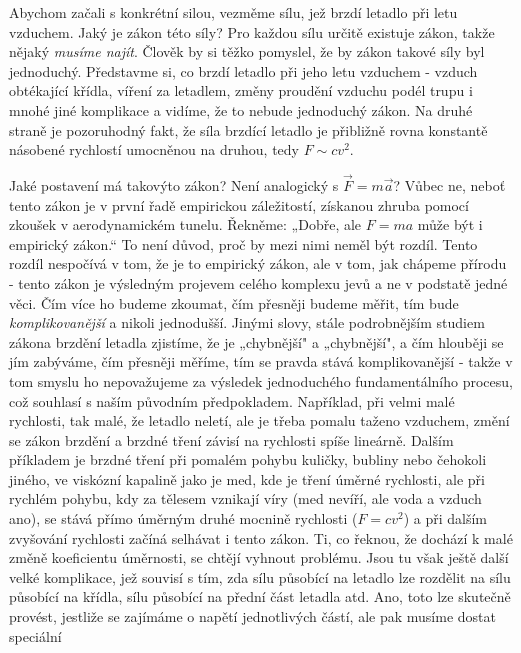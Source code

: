 {    Abychom začali s konkrétní silou, vezměme sílu, jež brzdí letadlo při letu vzduchem. Jaký je 
    zákon této síly? Pro každou sílu určitě existuje zákon, takže nějaký \emph{musíme najít}. 
    Člověk by si těžko pomyslel, že by zákon takové síly byl jednoduchý. Představme si, co brzdí 
    letadlo při jeho letu  vzduchem - vzduch obtékající křídla, víření za letadlem, změny proudění 
    vzduchu podél trupu i mnohé jiné komplikace a vidíme, že to nebude jednoduchý zákon. Na druhé 
    straně je pozoruhodný fakt, že síla brzdící letadlo je přibližně rovna konstantě násobené 
    rychlostí umocněnou na druhou, tedy \(F\sim cv^2\).
    
    Jaké postavení má takovýto zákon? Není analogický s \(\vec{F}= m\vec{a}\)? Vůbec ne, neboť 
    tento zákon je v první řadě empirickou záležitostí, získanou zhruba pomocí zkoušek v 
    aerodynamickém tunelu. Řekněme: „Dobře, ale \(F=ma\) může být i empirický zákon.“ To není 
    důvod, proč by mezi nimi neměl být rozdíl. Tento rozdíl nespočívá v tom, že je to empirický 
    zákon, ale v tom, jak chápeme přírodu - tento zákon je výsledným projevem celého komplexu jevů 
    a ne v podstatě jedné věci. Čím více ho budeme zkoumat, čím přesněji budeme měřit, tím bude 
    \emph{komplikovanější} a nikoli jednodušší. Jinými slovy, stále podrobnějším studiem zákona 
    brzdění letadla zjistíme, že je „chybnější" a „chybnější", a čím hlouběji se jím zabýváme, čím 
    přesněji měříme, tím se pravda stává komplikovanější - takže v tom smyslu ho nepovažujeme za 
    výsledek jednoduchého fundamentálního procesu, což souhlasí s naším původním předpokladem. 
    Například, při velmi malé rychlosti, tak malé, že letadlo neletí, ale je třeba pomalu taženo 
    vzduchem, změní se zákon brzdění a brzdné tření závisí na rychlosti spíše lineárně. Dalším 
    příkladem je brzdné tření při pomalém pohybu kuličky, bubliny nebo čehokoli jiného, ve viskózní 
    kapalině jako je med, kde je tření úměrné rychlosti, ale při rychlém pohybu, kdy za tělesem 
    vznikají víry (med nevíří, ale voda a vzduch ano), se stává přímo úměrným druhé mocnině 
    rychlosti (\(F=cv^2\)) a při dalším zvyšování rychlosti začíná selhávat i tento zákon. Ti, co 
    řeknou, že dochází k malé změně koeficientu úměrnosti, se chtějí vyhnout problému. Jsou tu však 
    ještě další velké komplikace, jež souvisí s tím, zda sílu působící na letadlo lze rozdělit na 
    sílu působící na křídla, sílu působící na přední část letadla atd. Ano, toto lze skutečně 
    provést, jestliže se zajímáme o napětí jednotlivých částí, ale pak musíme dostat speciální 
}
